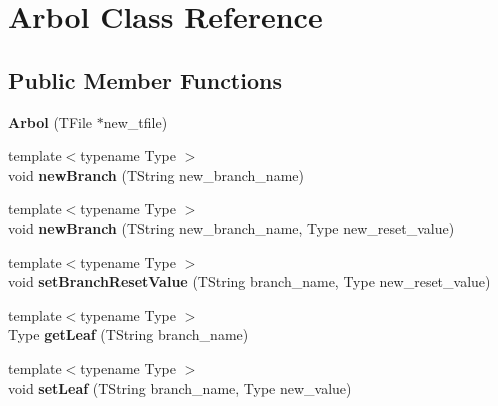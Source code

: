 \hypertarget{classArbol}{}\section{Arbol Class Reference}
\label{classArbol}
\subsection*{Public Member Functions}
\begin{DoxyCompactItemize}
\item 
{\bfseries Arbol} (T\+File $\ast$new\+\_\+tfile)\hypertarget{classArbol_a70f09d1535c225d3d8bc565d468ffe56}{}\label{classArbol_a70f09d1535c225d3d8bc565d468ffe56}

\item 
{\footnotesize template$<$typename Type $>$ }\\void {\bfseries new\+Branch} (T\+String new\+\_\+branch\+\_\+name)\hypertarget{classArbol_a552622885ffce15f1b1369fe44e729bb}{}\label{classArbol_a552622885ffce15f1b1369fe44e729bb}

\item 
{\footnotesize template$<$typename Type $>$ }\\void {\bfseries new\+Branch} (T\+String new\+\_\+branch\+\_\+name, Type new\+\_\+reset\+\_\+value)\hypertarget{classArbol_a5f38b399beb87ec5bf8cb53ff126d501}{}\label{classArbol_a5f38b399beb87ec5bf8cb53ff126d501}

\item 
{\footnotesize template$<$typename Type $>$ }\\void {\bfseries set\+Branch\+Reset\+Value} (T\+String branch\+\_\+name, Type new\+\_\+reset\+\_\+value)\hypertarget{classArbol_a38f72c5553a435a5b0e37ca55752126c}{}\label{classArbol_a38f72c5553a435a5b0e37ca55752126c}

\item 
{\footnotesize template$<$typename Type $>$ }\\Type {\bfseries get\+Leaf} (T\+String branch\+\_\+name)\hypertarget{classArbol_a92be3f8c4258247d65e7f66a8da70453}{}\label{classArbol_a92be3f8c4258247d65e7f66a8da70453}

\item 
{\footnotesize template$<$typename Type $>$ }\\void {\bfseries set\+Leaf} (T\+String branch\+\_\+name, Type new\+\_\+value)\hypertarget{classArbol_a7a8d3bec0bf5c00635a0b00fcd63cf01}{}\label{classArbol_a7a8d3bec0bf5c00635a0b00fcd63cf01}


\end{DoxyCompactItemize}

